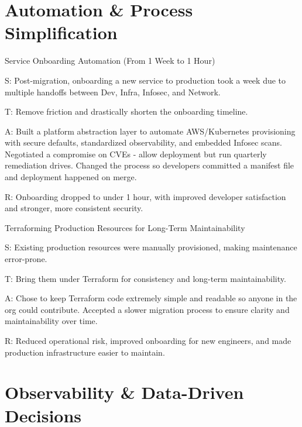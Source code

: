 \documentclass[11pt]{article}
\begin{document}
\section{Automation \& Process Simplification}

\begin{starstory}{Service Onboarding Automation (From 1 Week to 1 Hour)}
\begin{starlist}
\item[S:] Post-migration, onboarding a new service to production took a week due to multiple handoffs between Dev, Infra, Infosec, and Network.
\item[T:] Remove friction and drastically shorten the onboarding timeline.
\item[A:] Built a platform abstraction layer to automate AWS/Kubernetes provisioning with secure defaults, standardized observability, and embedded Infosec scans. Negotiated a compromise on CVEs - allow deployment but run quarterly remediation drives. Changed the process so developers committed a manifest file and deployment happened on merge.
\item[R:] Onboarding dropped to under 1 hour, with improved developer satisfaction and stronger, more consistent security.
\end{starlist}
\end{starstory}

\begin{starstory}{Terraforming Production Resources for Long-Term Maintainability}
\begin{starlist}
\item[S:] Existing production resources were manually provisioned, making maintenance error-prone.
\item[T:] Bring them under Terraform for consistency and long-term maintainability.
\item[A:] Chose to keep Terraform code extremely simple and readable so anyone in the org could contribute. Accepted a slower migration process to ensure clarity and maintainability over time.
\item[R:] Reduced operational risk, improved onboarding for new engineers, and made production infrastructure easier to maintain.
\end{starlist}
\end{starstory}

\section{Observability \& Data-Driven Decisions}
\end{document}
